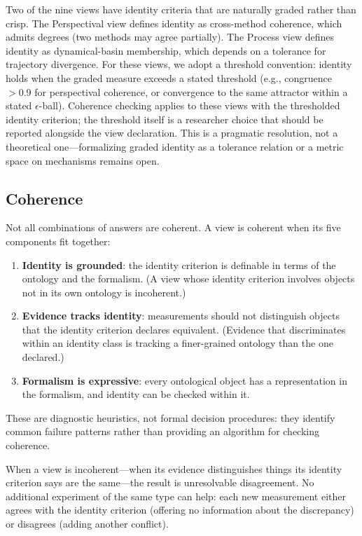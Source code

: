 \documentclass{article}
\begin{document}
Two of the nine views have identity criteria that are naturally graded rather than crisp.  The Perspectival view defines identity as cross-method coherence, which admits degrees (two methods may agree partially).  The Process view defines identity as dynamical-basin membership, which depends on a tolerance for trajectory divergence.  For these views, we adopt a threshold convention: identity holds when the graded measure exceeds a stated threshold (e.g., congruence $> 0.9$ for perspectival coherence, or convergence to the same attractor within a stated $\epsilon$-ball).  Coherence checking applies to these views with the thresholded identity criterion; the threshold itself is a researcher choice that should be reported alongside the view declaration.  This is a pragmatic resolution, not a theoretical one---formalizing graded identity as a tolerance relation or a metric space on mechanisms remains open.

\subsection{Coherence}\label{sec:coherence}

Not all combinations of answers are coherent.  A view is coherent when
its five components fit together:

\begin{enumerate}[leftmargin=*, label=(\roman*)]
\item \textbf{Identity is grounded}: the identity criterion is
      definable in terms of the ontology and the formalism.  (A view
      whose identity criterion involves objects not in its own ontology
      is incoherent.)
\item \textbf{Evidence tracks identity}: measurements should not
      distinguish objects that the identity criterion declares
      equivalent.  (Evidence that discriminates within an identity
      class is tracking a finer-grained ontology than the one
      declared.)
\item \textbf{Formalism is expressive}: every ontological object has
      a representation in the formalism, and identity can be checked
      within it.
\end{enumerate}

These are diagnostic heuristics, not formal decision procedures: they identify common failure patterns rather than providing an algorithm for checking coherence.

When a view is incoherent---when its evidence distinguishes things its
identity criterion says are the same---the result is unresolvable
disagreement.  No additional experiment of the same type can help:
each new measurement either agrees with the identity criterion (offering
no information about the discrepancy) or disagrees (adding another
conflict).
\end{document}
